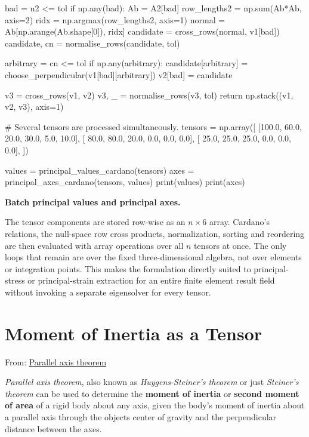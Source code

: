 \begin{itemize}
\begin{python}
    bad = n2 <= tol
    if np.any(bad):
        Ab = A2[bad]
        row_lengths2 = np.sum(Ab*Ab, axis=2)
        ridx = np.argmax(row_lengths2, axis=1)
        normal = Ab[np.arange(Ab.shape[0]), ridx]
        candidate = cross_rows(normal, v1[bad])
        candidate, cn = normalise_rows(candidate, tol)

        arbitrary = cn <= tol
        if np.any(arbitrary):
            candidate[arbitrary] = choose_perpendicular(v1[bad][arbitrary])
        v2[bad] = candidate

    v3 = cross_rows(v1, v2)
    v3, _ = normalise_rows(v3, tol)
    return np.stack((v1, v2, v3), axis=1)


# Several tensors are processed simultaneously.
tensors = np.array([
    [100.0, 60.0, 20.0, 30.0,  5.0, 10.0],
    [ 80.0, 80.0, 20.0,  0.0,  0.0,  0.0],
    [ 25.0, 25.0, 25.0,  0.0,  0.0,  0.0],
])

values = principal_values_cardano(tensors)
axes = principal_axes_cardano(tensors, values)
print(values)
print(axes)
\end{python}

\begin{bbox}
\textbf{Batch principal values and principal axes.}

The tensor components are stored row-wise as an $n\times6$ array. Cardano's
relations, the null-space row cross products, normalization, sorting and
reordering are then evaluated with array operations over all $n$ tensors at
once. The only loops that remain are over the fixed three-dimensional algebra,
not over elements or integration points. This makes the formulation directly
suited to principal-stress or principal-strain extraction for an entire finite
element result field without invoking a separate eigensolver for every tensor.
\end{bbox}




\end{itemize}


\section{Moment of Inertia as a Tensor}

From: \href{https://en.wikipedia.org/wiki/Parallel_axis_theorem}{Parallel axis theorem}

\textit{Parallel axis theorem}, also known as \textit{Huygens-Steiner's theorem}
or just \textit{Steiner's theorem} can be used to determine the \textbf{moment of inertia}
or \textbf{second moment of area} of a rigid body about any axis, given the body's
moment of inertia about a parallel axis through the objects center of gravity
and the perpendicular distance between the axes.

